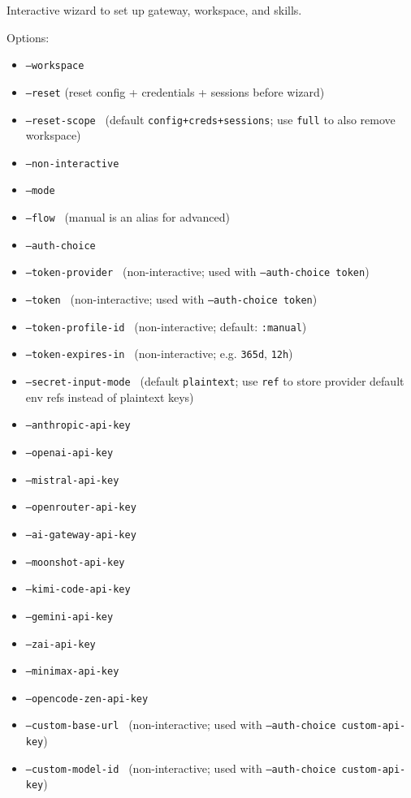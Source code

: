 Interactive wizard to set up gateway, workspace, and skills.

Options:

\begin{itemize}
  \item \texttt{--workspace }
  \item \texttt{--reset} (reset config + credentials + sessions before wizard)
  \item \texttt{--reset-scope } (default \texttt{config+creds+sessions}; use \texttt{full} to also remove workspace)
  \item \texttt{--non-interactive}
  \item \texttt{--mode }
  \item \texttt{--flow } (manual is an alias for advanced)
  \item \texttt{--auth-choice }
  \item \texttt{--token-provider } (non-interactive; used with \texttt{--auth-choice token})
  \item \texttt{--token } (non-interactive; used with \texttt{--auth-choice token})
  \item \texttt{--token-profile-id } (non-interactive; default: \texttt{:manual})
  \item \texttt{--token-expires-in } (non-interactive; e.g. \texttt{365d}, \texttt{12h})
  \item \texttt{--secret-input-mode } (default \texttt{plaintext}; use \texttt{ref} to store provider default env refs instead of plaintext keys)
  \item \texttt{--anthropic-api-key }
  \item \texttt{--openai-api-key }
  \item \texttt{--mistral-api-key }
  \item \texttt{--openrouter-api-key }
  \item \texttt{--ai-gateway-api-key }
  \item \texttt{--moonshot-api-key }
  \item \texttt{--kimi-code-api-key }
  \item \texttt{--gemini-api-key }
  \item \texttt{--zai-api-key }
  \item \texttt{--minimax-api-key }
  \item \texttt{--opencode-zen-api-key }
  \item \texttt{--custom-base-url } (non-interactive; used with \texttt{--auth-choice custom-api-key})
  \item \texttt{--custom-model-id } (non-interactive; used with \texttt{--auth-choice custom-api-key})

\end{itemize}
